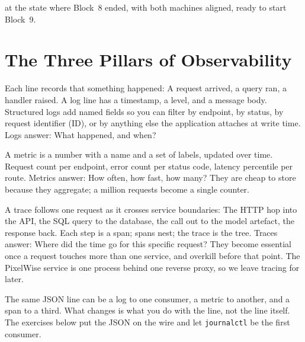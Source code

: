  at the state where Block~8 ended, with both
machines aligned, ready to start Block~9.




\newpage
\section{The Three Pillars of Observability}

Each line records that something happened: A request arrived, a query
ran, a handler raised. A log line has a timestamp, a level, and a
message body. Structured logs add named fields so you can filter by
endpoint, by status, by request identifier (ID), or by anything else
the application attaches at write time. Logs answer: What happened, and
when?

A metric is a number with a name and a set of labels, updated over time.
Request count per endpoint, error count per status code, latency
percentile per route. Metrics answer: How often, how fast, how many?
They are cheap to store because they aggregate; a million requests
become a single counter.


A trace follows one request as it crosses service boundaries: The HTTP
hop into the API, the SQL query to the database, the call out to the
model artefact, the response back. Each step is a span; spans nest;
the trace is the tree. Traces answer: Where did the time go for this
specific request? They become essential once a request touches more
than one service, and overkill before that point. The PixelWise service
is one process behind one reverse proxy, so we leave tracing for later.

The same JSON line can be a log to one consumer, a metric to another,
and a span to a third. What changes is what you do with the line, not
the line itself. The exercises below put the JSON on the wire and let
\texttt{journalctl} be the first consumer.

